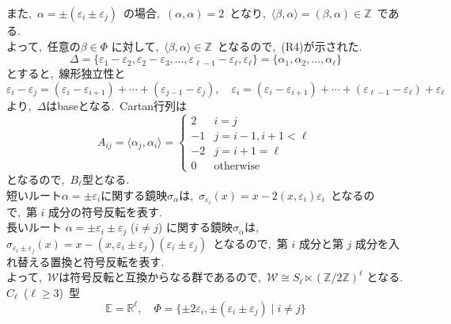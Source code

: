 \documentclass[uplatex,dvipdfmx]{jsarticle}
\begin{document}
\begin{myproof}
    また,~$\alpha = \pm (\varepsilon_i \pm \varepsilon_j)$~の場合,~$(\alpha, \alpha) = 2$~となり,~$\langle \beta, \alpha \rangle = (\beta, \alpha) \in \mathbb{Z}$~である.~\\
    よって,~任意の$\beta \in \Phi$ に対して,~$\langle \beta, \alpha \rangle \in \mathbb{Z}$~となるので,~(R4)が示された.
    \begin{equation*}
        \Delta = \{\varepsilon_1 - \varepsilon_2, \varepsilon_2 - \varepsilon_3, \dots, \varepsilon_{\ell-1} - \varepsilon_\ell, \varepsilon_\ell\} = \{\alpha_1, \alpha_2, \dots, \alpha_\ell\}
    \end{equation*}
    とすると,~線形独立性と
    \begin{equation*}
        \varepsilon_i - \varepsilon_j = (\varepsilon_i - \varepsilon_{i+1}) + \cdots + (\varepsilon_{j-1} - \varepsilon_j), \quad \varepsilon_i = (\varepsilon_i - \varepsilon_{i+1}) + \cdots + (\varepsilon_{\ell-1} - \varepsilon_\ell) + \varepsilon_\ell
    \end{equation*}
    より,~$\Delta$はbaseとなる.~Cartan行列は
    \begin{equation*}
        A_{ij} = \langle \alpha_j, \alpha_i \rangle = \begin{cases}
            2 & i = j \\
            -1 & j = i-1, i+1 < \ell \\
            -2 & j = i+1 = \ell \\
            0 & \text{otherwise}
        \end{cases}
    \end{equation*}
    となるので,~$B_\ell$型となる.~\\
    短いルート$\alpha = \pm \varepsilon_i$に関する鏡映$\sigma_\alpha$は,~$\sigma_{\varepsilon_i}(x) = x - 2(x, \varepsilon_i)\varepsilon_i$~となるので,~第 $i$ 成分の符号反転を表す.\\
    長いルート $\alpha = \pm \varepsilon_i \pm \varepsilon_j$ ($i \neq j$) に関する鏡映$\sigma_\alpha$は,~$\sigma_{\varepsilon_i \pm \varepsilon_j}(x) = x - (x, \varepsilon_i \pm \varepsilon_j)(\varepsilon_i \pm \varepsilon_j)$~となるので,~第 $i$ 成分と第 $j$ 成分を入れ替える置換と符号反転を表す.\\
    よって,~$\mathscr{W}$は符号反転と互換からなる群であるので,~$\mathscr{W} \cong S_\ell \ltimes (\mathbb{Z}/2\mathbb{Z})^\ell$ となる.\\
    $C_\ell$~($\ell \geq 3$)~型\\
    \begin{equation*}
        \mathbb{E} = \mathbb{R}^\ell, \quad \Phi = \{\pm 2\varepsilon_i, \pm (\varepsilon_i \pm \varepsilon_j) \mid i \neq j\}

\end{equation*}
\end{myproof}
\end{document}
